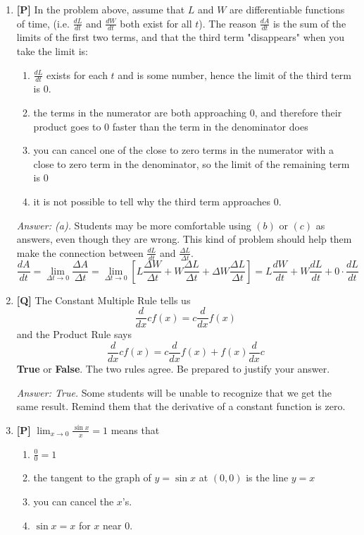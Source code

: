\documentclass[12pt]{article}
\begin{document}
\begin{enumerate}
\item {\bf [P]} In the problem above, assume that $L$ and $W$ are differentiable functions of time, (i.e. $\frac{dL}{dt}$ and $\frac{dW}{dt}$ both exist for all $t$). The reason $\frac{dA}{dt}$ is the sum of the limits of the first two terms, and that the third term "disappears" when you take the limit is:
\begin {enumerate}
\item $\frac{dL}{dt}$ exists for each $t$ and is some number, hence the limit of the third term is 0.
\item the terms in the numerator are both approaching 0, and therefore their product goes to 0 faster than the term in the denominator does
\item you can cancel one of the close to zero terms in the numerator with a close to zero term in the denominator, so the limit of the remaining term is 0
\item it is not possible to tell why the third term approaches 0.
\end {enumerate}

{\it Answer: (a).} Students may be more comfortable using $(b)$ or $(c)$ as answers, even though they are wrong. This kind of problem should help them make the connection between $\frac{dL}{dt}$ and $\frac{\Delta L}{\Delta t}$.
$$\displaystyle{\frac{dA}{dt}=\lim_{\Delta t \to 0}\frac{\Delta A}{\Delta t}=\lim_{\Delta t \to 0}\left[L\frac{\Delta W}{\Delta t}+W\frac{\Delta L}{\Delta t}+\Delta W\frac{\Delta L}{\Delta t}\right]=L \frac{dW}{dt}+W \frac{dL}{dt}+0\cdot \frac{dL}{dt}}$$

\bigskip

\item {\bf [Q]} The Constant Multiple Rule tells us $$\frac{d}{dx}cf(x)=c \frac{d}{dx}f(x)$$
 and the Product Rule says $$\frac{d}{dx}cf(x)=c\frac{d}{dx}f(x)+f(x)\frac{d}{dx}c$$
\textbf{True} or \textbf{False}. The two rules agree. Be prepared to justify your answer.

{\it Answer: True.} Some students will be unable to recognize that we get the same result. Remind them that the derivative of a constant function is zero.

\bigskip

\item {\bf [P]}
$\displaystyle{\lim_{x\rightarrow 0} \frac{\sin x}{x} = 1}$ means that

\begin{enumerate}
\item $\frac{0}{0} =1$
\item the tangent to the graph of $y=\sin x$ at $(0,0)$ is the line $y=x$
\item you can cancel the $x$'s.
\item $\sin x =x$ for $x$ near 0.
\end{enumerate}


\end{enumerate}
\end{document}
